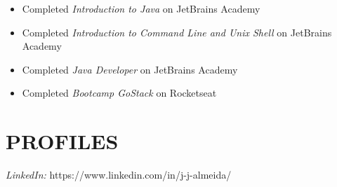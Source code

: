 \documentclass[margin, 10pt]{res} %
\begin{document}
\begin{resume}
\begin{itemize}
\item Completed {\sl Introduction to Java} on JetBrains Academy
\item Completed {\sl Introduction to Command Line and Unix Shell} on JetBrains Academy
\item Completed {\sl Java Developer} on JetBrains Academy
\item Completed {\sl Bootcamp GoStack} on Rocketseat
\end{itemize}


\section{PROFILES}

{\sl LinkedIn:} https://www.linkedin.com/in/j-j-almeida/



\end{resume}
\end{document}
